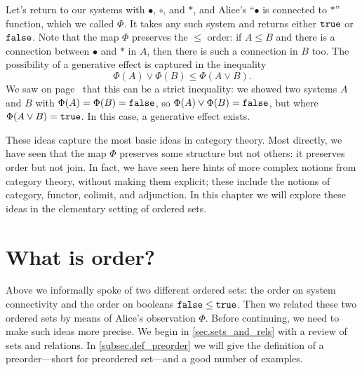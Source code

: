 \documentclass[7Sketches]{subfiles}
\begin{document}
Let's return to our systems with $\bullet$, $\circ$, and $\ast$, and Alice's
``$\bullet$ is connected to $\ast$'' function, which we called $\Phi$. It takes
any such system and returns either $\mathtt{true}$ or $\mathtt{false}$. Note that the map $\Phi$
preserves the $\leq$ order: if $A\leq B$ and there is a connection between
$\bullet$ and $\ast$ in $A$, then there is such a connection in $B$ too. The
possibility of a generative effect is captured in the inequality
\begin{equation}%
\label{eqn.generative_def}
\Phi(A) \vee \Phi(B) \leq \Phi(A\vee B).
\end{equation}
We saw on page~\pageref{page.generativity} that this can be a strict inequality: we showed two systems $A$ and $B$
with $\Phi(A)=\Phi(B)=\mathtt{false}$, so $\Phi(A)\vee\Phi(B)=\mathtt{false}$, but where
$\Phi(A\vee B)=\mathtt{true}$. In this case, a generative effect exists.%

These ideas capture the most basic ideas in category theory. Most directly, we have seen that the map $\Phi$ preserves some structure but not others: it preserves order but not join. In fact, we have seen here hints of more complex notions from category theory, without making them explicit; these include the notions of category, functor, colimit, and adjunction. In this
chapter we will explore these ideas in the elementary setting of ordered sets.


\section{What is order?} %
\label{sec.preorders}

Above we informally spoke of two different ordered sets: the order on system
connectivity and the order on booleans $\mathtt{false}\leq\mathtt{true}$. Then we related these
two ordered sets by means of Alice's observation $\Phi$. Before continuing, we need
to make such ideas more precise. We begin in \cref{sec.sets_and_rels} with a
review of sets and relations. In \cref{subsec.def_preorder} we will give the
definition of a preorder---short for preordered set---and a good number
of examples.
\end{document}

